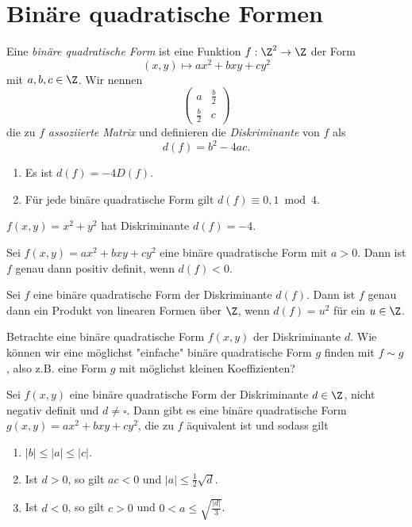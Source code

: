\section{Binäre quadratische Formen}

\begin{defn*}
	Eine \emph{binäre quadratische Form} ist eine Funktion $f: \Z^2 \to \Z$ der Form
	\[ (x,y) \mapsto ax^2 + bxy + cy^2 \]
	mit $a,b,c \in \Z$. Wir nennen \[ \begin{pmatrix}
		a & \frac{b}{2} \\ \frac{b}{2} & c
	\end{pmatrix} \] die zu $f$ \emph{assoziierte Matrix} und definieren die \emph{Diskriminante} von $f$ als
	\[ d(f) = b^2-4ac. \]
\end{defn*}

\begin{rem*}
	\begin{enumerate}[label={\roman*})]
		\item Es ist $d(f) = -4 D(f)$.
		\item Für jede binäre quadratische Form gilt $d(f) \equiv 0,1 \bmod 4$.
	\end{enumerate}
\end{rem*}

\begin{exmp*}
	$f(x,y) = x^2+y^2$ hat Diskriminante $d(f) = -4$.
\end{exmp*}

\begin{lem}\autolabel
	Sei $f(x,y) = ax^2+bxy+cy^2$ eine binäre quadratische Form mit $a>0$. Dann ist $f$ genau dann positiv definit, wenn $d(f)<0$.
\end{lem}

\begin{lem}\autolabel
	Sei $f$ eine binäre quadratische Form der Diskriminante $d(f)$. Dann ist $f$ genau dann ein Produkt von linearen Formen über $\Z$, wenn $d(f) = u^2$ für ein $u \in \Z$.
\end{lem}

\begin{frage*}
	Betrachte eine binäre quadratische Form $f(x,y)$ der Diskriminante $d$. Wie können wir eine möglichst "einfache" binäre quadratische Form $g$ finden mit $f \sim g$, also z.B. eine Form $g$ mit möglichst kleinen Koeffizienten?
\end{frage*}

\begin{lem}\autolabel
	Sei $f(x,y)$ eine binäre quadratische Form der Diskriminante $d \in \Z$, nicht negativ definit und $d \neq \square$. Dann gibt es eine binäre quadratische Form $g(x,y) = ax^2+bxy+cy^2$, die zu $f$ äquivalent ist und sodass gilt
	\begin{enumerate}[label={\roman*})]
		\item $|b| \leq |a| \leq |c|$.
		\item Ist $d>0$, so gilt $ac < 0$ und $|a| \leq \frac{1}{2} \sqrt{d}$.
		\item Ist $d < 0$, so gilt $c > 0$ und $0 < a \leq \sqrt{\frac{|d|}{3}}$.
	\end{enumerate}
\end{lem}